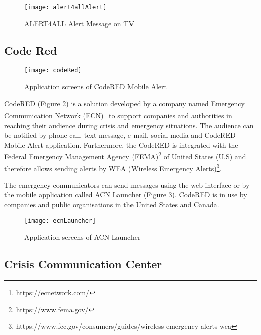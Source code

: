 \begin{figure}[]
\begin{center}
  \texttt{[image: alert4allAlert]}
\caption{ALERT4ALL Alert Message on TV}
\label{fig:alert4allAlert}
\end{center}
\end{figure}

\subsection*{Code Red}

\begin{figure}[]
\begin{center}
  \texttt{[image: codeRed]}
\caption{Application screens of CodeRED Mobile Alert}
\label{fig:codRed}
\end{center}
\end{figure}

CodeRED (Figure \ref{fig:codRed}) is a solution developed by a company named Emergency Communication Network (ECN)\footnote{https://ecnetwork.com/} to support companies and authorities in reaching their audience during crisis and emergency situations. The audience can be notified by phone call, text message, e-mail, social media and CodeRED Mobile Alert application. Furthermore, the CodeRED is integrated with the Federal Emergency Management Agency (FEMA)\footnote{https://www.fema.gov/} of United States (U.S) and therefore allows sending alerts by WEA (Wireless Emergency Alerts)\footnote{https://www.fcc.gov/consumers/guides/wireless-emergency-alerts-wea}.

The emergency communicators can send messages using the web interface or by the mobile application called ACN Launcher (Figure \ref{fig:ecnLauncher}). CodeRED is in use by companies and public organisations in the United States and Canada.

\begin{figure}[]
\begin{center}
  \texttt{[image: ecnLauncher]}
\caption{Application screens of ACN Launcher}
\label{fig:ecnLauncher}
\end{center}
\end{figure}

\subsection*{Crisis Communication Center}

